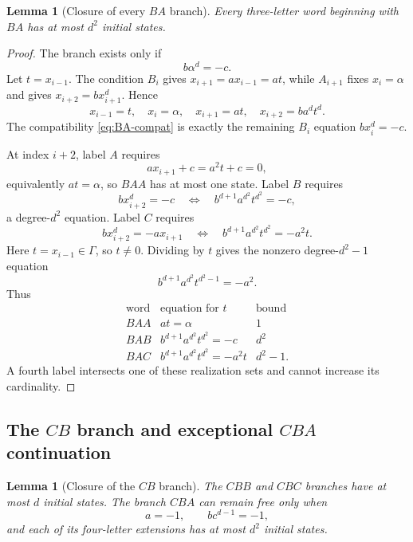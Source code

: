 \documentclass[11pt]{article}
\newtheorem{lemma}[theorem]{Lemma}
\theoremstyle{definition}
\theoremstyle{remark}
\begin{document}
\begin{lemma}[Closure of every \(BA\) branch]\label{lem:BA}
Every three-letter word beginning with \(BA\) has at most \(d^2\) initial
states.
\end{lemma}

\begin{proof}
The branch exists only if
\begin{equation}\label{eq:BA-compat}
 b\alpha^d=-c.
\end{equation}
Let \(t=x_{i-1}\).  The condition \(B_i\) gives
\(x_{i+1}=a x_{i-1}=at\), while \(A_{i+1}\) fixes
\(x_i=\alpha\) and gives \(x_{i+2}=b x_{i+1}^d\).  Hence
\begin{equation}\label{eq:BA-coordinates}
 x_{i-1}=t,\quad x_i=\alpha,\quad
 x_{i+1}=at,\quad x_{i+2}=ba^dt^d.
\end{equation}
The compatibility \eqref{eq:BA-compat} is exactly the remaining
\(B_i\) equation \(b x_i^d=-c\).

At index \(i+2\), label \(A\) requires
\[
 a x_{i+1}+c=a^2t+c=0,
\]
equivalently \(at=\alpha\), so \(BAA\) has at most one state.  Label \(B\)
requires
\[
 b x_{i+2}^d=-c
 \quad\Longleftrightarrow\quad
 b^{d+1}a^{d^2}t^{d^2}=-c,
\]
a degree-\(d^2\) equation.  Label \(C\) requires
\[
 b x_{i+2}^d=-a x_{i+1}
 \quad\Longleftrightarrow\quad
 b^{d+1}a^{d^2}t^{d^2}=-a^2t.
\]
Here \(t=x_{i-1}\in\Gamma\), so \(t\ne0\).  Dividing by \(t\) gives the
nonzero degree-\(d^2-1\) equation
\[
 b^{d+1}a^{d^2}t^{d^2-1}=-a^2.
\]
Thus
\begin{equation}\label{eq:BA-close}
\begin{array}{c|c|c}
 \text{word}&\text{equation for }t&\text{bound}\\ \hline
 BAA&at=\alpha&1\\
 BAB&b^{d+1}a^{d^2}t^{d^2}=-c&d^2\\
 BAC&b^{d+1}a^{d^2}t^{d^2}=-a^2t&d^2-1.
\end{array}
\end{equation}
A fourth label intersects one of these realization sets and cannot increase
its cardinality.
\end{proof}

\subsection{The \(CB\) branch and exceptional \(CBA\) continuation}

\begin{lemma}[Closure of the \(CB\) branch]\label{lem:CB}
The \(CBB\) and \(CBC\) branches have at most \(d\) initial states.  The
branch \(CBA\) can remain free only when
\begin{equation}\label{eq:CBA-exception}
 a=-1,\qquad bc^{d-1}=-1,
\end{equation}
and each of its four-letter extensions has at most \(d^2\) initial states.
\end{lemma}
\end{document}
